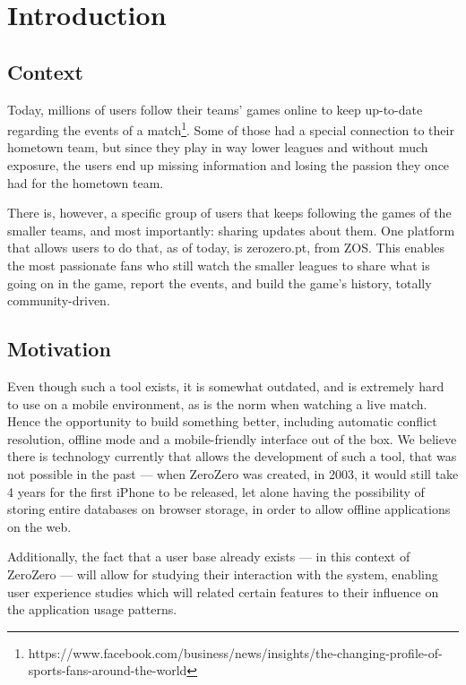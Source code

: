 \chapter{Introduction} \label{chap:intro}

\section{Context}

Today, millions of users follow their teams' games online to keep up-to-date regarding the events of a match\footnote{https://www.facebook.com/business/news/insights/the-changing-profile-of-sports-fans-around-the-world}. Some of those had a special connection to their hometown team, but since they play in way lower leagues and without much exposure, the users end up missing information and losing the passion they once had for the hometown team.

There is, however,  a specific group of users that keeps following the games of the smaller teams, and most importantly: sharing updates about them. One platform that allows users to do that, as of today, is zerozero.pt, from ZOS. This enables the most passionate fans who still watch the smaller leagues to share what is going on in the game, report the events, and build the game's history, totally community-driven.

\section{Motivation}

 Even though such a tool exists, it is somewhat outdated, and is extremely hard to use on a mobile environment, as is the norm when watching a live match. Hence the opportunity to build something better, including automatic conflict resolution, offline mode and a mobile-friendly interface out of the box. We believe there is technology currently that allows the development of such a tool, that was not possible in the past --- when ZeroZero was created, in 2003, it would still take 4 years for the first iPhone to be released, let alone having the possibility of storing entire databases on browser storage, in order to allow offline applications on the web.
 
 Additionally, the fact that a user base already exists --- in this context of ZeroZero --- will allow for studying their interaction with the system, enabling user experience studies which will related certain features to their influence on the application usage patterns.

